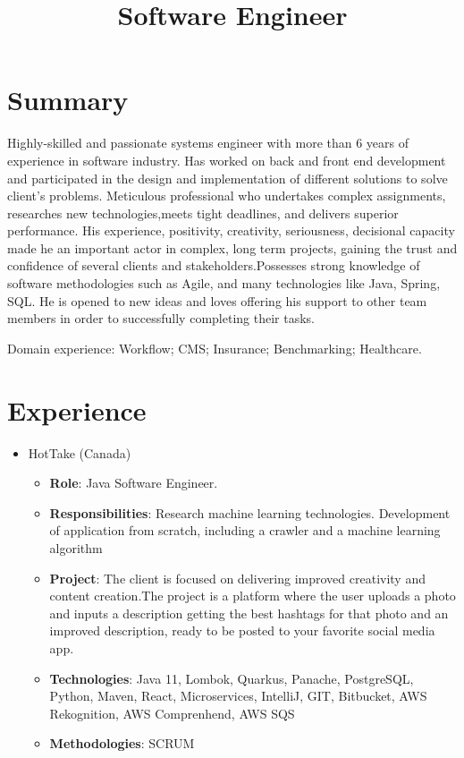 \documentclass[11pt,a4paper,sans]{moderncv}        %
\title{Software Engineer}                               %
\begin{document}
\makecvtitle

\section{Summary}
Highly-skilled and passionate systems engineer with more than 6 years of experience in software industry. 
Has worked on back and front end development and participated in the design and implementation of different solutions to solve client’s problems.
Meticulous professional who undertakes complex assignments, researches new technologies,meets tight deadlines, and delivers superior performance. 
His experience, positivity, creativity, seriousness, decisional capacity made he an important actor in complex, 
long term projects, gaining the trust and confidence of several clients and stakeholders.Possesses strong knowledge of software methodologies such as Agile, 
and many technologies like Java, Spring, SQL. He is opened to new ideas and loves offering his support to other team members in order to successfully completing their tasks.

\medskip Domain experience: Workflow; CMS; Insurance; Benchmarking; Healthcare.

\vspace{10mm}

\section{Experience}
  {
    \begin{itemize}
      \item HotTake (Canada)
        \begin{itemize}
          \item \textbf{Role}: Java Software Engineer. 
          \item \textbf{Responsibilities}:  Research machine learning technologies. Development of application from scratch, including a crawler and a machine learning algorithm
          \item \textbf{Project}: The client is focused on delivering improved creativity and content creation.The project is a platform where the user uploads a photo and inputs a description getting the best hashtags for that photo and an improved description, ready to be posted to your favorite social media app.
          \item \textbf{Technologies}: Java 11, Lombok, Quarkus, Panache, PostgreSQL, Python, Maven, React, Microservices, IntelliJ, GIT, Bitbucket, AWS Rekognition, AWS Comprenhend, AWS SQS
          \item \textbf{Methodologies}: SCRUM
        \end{itemize}
    \end{itemize}
  }
\end{document}
